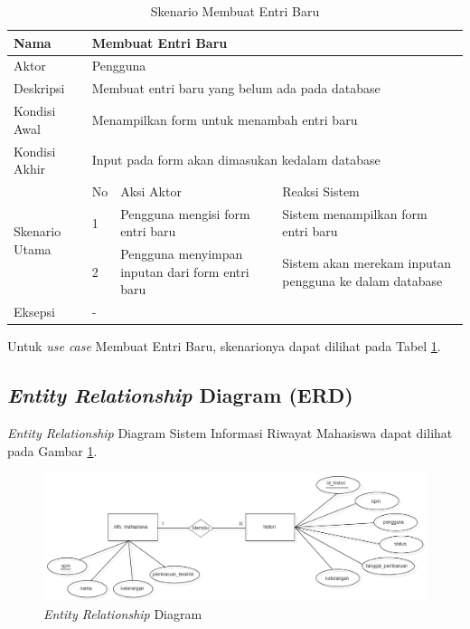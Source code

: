 \begin{table}[h]
\centering
\caption[Tabel Skenario Membuat Entri Baru]{Skenario Membuat Entri Baru}
\label{tab:skenarioentribaru}
\begin{tabular}{|p{1.4cm}|p{0.4cm}|p{2cm}|p{2cm}|p{2cm}|p{2cm}|}
\hline
Nama & \multicolumn{5}{p{8cm}|}{Membuat Entri Baru} \\ \hline
Aktor & \multicolumn{5}{p{8cm}|}{Pengguna} \\ \hline
Deskripsi & \multicolumn{5}{p{8cm}|}{Membuat entri baru yang belum ada pada
database} \\ \hline
Kondisi Awal & \multicolumn{5}{p{8cm}|}{Menampilkan form untuk menambah entri
baru} \\ \hline
Kondisi Akhir & \multicolumn{5}{p{8cm}|}{Input pada form akan dimasukan kedalam
database} \\ \hline
\multirow{3}{*}{\parbox{1.4cm}{Skenario Utama}} & No &
\multicolumn{2}{p{4cm}|}{Aksi Aktor} & \multicolumn{2}{p{4cm}|}{Reaksi Sistem}
\\ \cline{2-6}
& 1 & \multicolumn{2}{p{4cm}|}{Pengguna mengisi form entri baru} &
\multicolumn{2}{p{4cm}|}{Sistem menampilkan form entri baru} \\ \cline{2-6}
& 2 & \multicolumn{2}{p{4cm}|}{Pengguna menyimpan inputan dari form entri baru}
& \multicolumn{2}{p{4cm}|}{Sistem akan merekam inputan pengguna ke dalam
database} \\ \hline
Eksepsi & \multicolumn{5}{p{8cm}|}{-} \\ \hline
\end{tabular}
\end{table}

Untuk {\it use case} Membuat Entri Baru, skenarionya dapat dilihat pada Tabel
\ref{tab:skenarioentribaru}.

\subsection{{\it Entity Relationship} Diagram (ERD)}
{\it Entity Relationship} Diagram Sistem Informasi Riwayat Mahasiswa dapat
dilihat pada Gambar \ref{fig:erd}.

\begin{figure}[H]
\centering
\includegraphics[scale=0.4]{Gambar/ERD.png}
\caption[{\it Entity Relationship} Diagram]{{\it Entity Relationship} Diagram} 
\label{fig:erd}
\end{figure}

